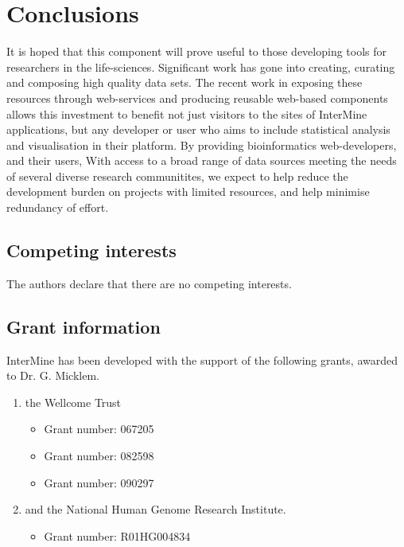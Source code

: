\documentclass[10pt,a4paper,twocolumn]{article}
\begin{document}
\section*{Conclusions}

It is hoped that this component will prove useful to those developing tools
for researchers in the life-sciences. Significant work has gone into creating,
curating and composing high quality data sets. The recent work in exposing these
resources through web-services and producing reusable web-based components
allows this investment to benefit not just visitors to the sites of InterMine applications,
but any developer or user who aims to include statistical analysis and visualisation in
their platform. By providing bioinformatics web-developers, and their users, With access to a broad range of data sources meeting the needs 
of several diverse research communitites, we expect to help reduce the development 
burden on projects with limited resources, and help minimise redundancy of effort.

\subsection*{Competing interests}

The authors declare that there are no competing interests.

\subsection*{Grant information}
InterMine has been developed with the support of the following grants, awarded
to Dr. G. Micklem.

\begin{enumerate}
\item the Wellcome Trust
 \begin{itemize}
 \item{Grant number: 067205}
 \item{Grant number: 082598}
 \item{Grant number: 090297}
 \end{itemize}
\item and the National Human Genome Research Institute.
 \begin{itemize}
 \item{Grant number: R01HG004834}
 \end{itemize}
\end{enumerate}

\nocite{*}
{\small
}
\end{document}
